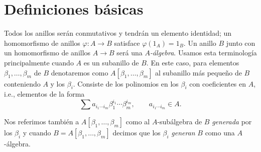 \section{Definiciones básicas}

Todos los anillos serán conmutativos y tendrán un elemento identidad; un homomorfismo de anillos $\varphi\colon A \to B$ satisface $\varphi(1_A) = 1_B$. Un anillo $B$ junto con un homomorfismo de anillos $A\to B$ será una \emph{$A$-álgebra}. Usamos esta terminología principalmente cuando $A$ es un subanillo de $B$. En este caso, para elementos $\beta_1, \ldots, \beta_m$ de $B$ denotaremos como $A[\beta_1,\ldots,\beta_m]$ al subanillo más pequeño de $B$ conteniendo $A$ y los $\beta_i$. Consiste de los polinomios en los $\beta_i$ con coeficientes en $A$, i.e., elementos de la forma
\[
  \sum a_{i_1\cdots i_m} \beta_1^{i_1}\cdots \beta_m^{i_m}, \qquad  a_{i_1\cdots i_m} \in A.
\]

Nos referimos también a $A[\beta_1,\ldots, \beta_m]$ como al $A$-subálgebra de $B$ \emph{generada} por los $\beta_i$ y cuando $B = A[\beta_1,\ldots, \beta_m]$ decimos que los $\beta_i$ \emph{generan} $B$ como una $A$-álgebra.